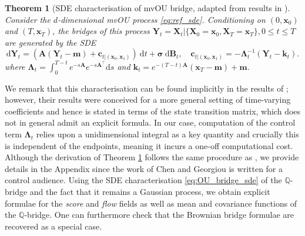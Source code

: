 \documentclass{article}
\newcommand{\diff}{\mathrm{d}}
\theoremstyle{newstyle}
\newtheorem{thm}{Theorem}
\begin{document}
\begin{thm}[SDE characterisation of mvOU bridge, adapted from results in \cite{chen2015stochastic}]\label{thm:sde_ou_bridge}
  Consider the $d$-dimensional mvOU process \eqref{eq:ref_sde}. 
  Conditioning on $(0, \bm{x}_0)$ and $(T, \bm{x}_T)$, the \emph{bridges} of this process $\bm{Y}_t = \bm{X}_t | \{ \bm{X}_0 = \bm{x}_0, \bm{X}_T = \bm{x}_T \}, 0 \leq t \leq T$ are generated by the SDE
  \begin{equation}
    \diff \bm{Y}_t = (\bm{A} (\bm{Y}_t - \bm{m}) + \bm{c}_{t | (\bm{x}_0, \bm{x}_1)}) \: \diff t + \bm{\sigma} \: \diff \bm{B}_t, \quad \bm{c}_{t | (\bm{x}_0, \bm{x}_1)} = -\bm{\Lambda}_t^{-1} (\bm{Y}_t - \bm{k}_t).  \label{eq:OU_bridge_sde}
  \end{equation}
  where $\bm{\Lambda}_t = \int_0^{T-t} e^{-s \bm{A}} e^{-s \bm{A}^\top} \diff s$ and $\bm{k}_t = e^{-(T - t) \bm{A}} (\bm{x}_T - \bm{m}) + \bm{m}$.
\end{thm}

We remark that this characterisation can be found implicitly in the results of \cite{chen2015stochastic}; however, their results were conceived for a more general setting of time-varying coefficients and hence is stated in terms of the state transition matrix, which does not in general admit an explicit formula. In our case, computation of the control term $\bm{\Lambda}_t$ relies upon a unidimensional integral as a key quantity and crucially this is independent of the endpoints, meaning it incurs a one-off computational cost. Although the derivation of Theorem \ref{thm:sde_ou_bridge} follows the same procedure as \cite{chen2015stochastic}, we provide details in the Appendix since the work of Chen and Georgiou \cite{chen2015stochastic} is written for a control audience.
Using the SDE characterisation \eqref{eq:OU_bridge_sde} of the $\mathbb{Q}$-bridge and the fact that it remains a Gaussian process, we obtain explicit formulae for the \emph{score} and \emph{flow} fields as well as mean and covariance functions of the $\mathbb{Q}$-bridge. One can furthermore check that the Brownian bridge formulae are recovered as a special case. 
\end{document}
